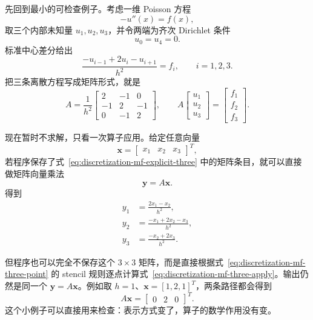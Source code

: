 先回到最小的可检查例子。考虑一维 Poisson 方程
\begin{equation}
-u''(x)=f(x),
\end{equation}
取三个内部未知量 $u_1,u_2,u_3$，并令两端为齐次 Dirichlet 条件
\begin{equation}
u_0=u_4=0.
\end{equation}
标准中心差分给出
\begin{equation}
\frac{-u_{i-1}+2u_i-u_{i+1}}{h^2}=f_i,
\qquad i=1,2,3.
\label{eq:discretization-mf-three-point}
\end{equation}
把三条离散方程写成矩阵形式，就是
\begin{equation}
\boxed{
A=
\frac1{h^2}
\begin{bmatrix}
2&-1&0\\
-1&2&-1\\
0&-1&2
\end{bmatrix},
\qquad
A
\begin{bmatrix}
u_1\\u_2\\u_3
\end{bmatrix}
=
\begin{bmatrix}
f_1\\f_2\\f_3
\end{bmatrix}.
}
\label{eq:discretization-mf-explicit-three}
\end{equation}

现在暂时不求解，只看一次算子应用。给定任意向量
\begin{equation}
\bm x=
\begin{bmatrix}
x_1&x_2&x_3
\end{bmatrix}^T,
\end{equation}
若程序保存了式~\eqref{eq:discretization-mf-explicit-three} 中的矩阵条目，就可以直接做矩阵向量乘法
\begin{equation}
\bm y=A\bm x.
\end{equation}
得到
\begin{equation}
\begin{aligned}
y_1&=\frac{2x_1-x_2}{h^2},\\
y_2&=\frac{-x_1+2x_2-x_3}{h^2},\\
y_3&=\frac{-x_2+2x_3}{h^2}.
\end{aligned}
\label{eq:discretization-mf-three-apply}
\end{equation}

但程序也可以完全不保存这个 $3\times3$ 矩阵，而是直接根据式~\eqref{eq:discretization-mf-three-point} 的 stencil 规则逐点计算式~\eqref{eq:discretization-mf-three-apply}。输出仍然是同一个 $\bm y=A\bm x$。例如取 $h=1$、$\bm x=[1,2,1]^T$，两条路径都会得到
\begin{equation}
A\bm x=
\begin{bmatrix}
0&2&0
\end{bmatrix}^T.
\end{equation}
这个小例子可以直接用来检查：表示方式变了，算子的数学作用没有变。

